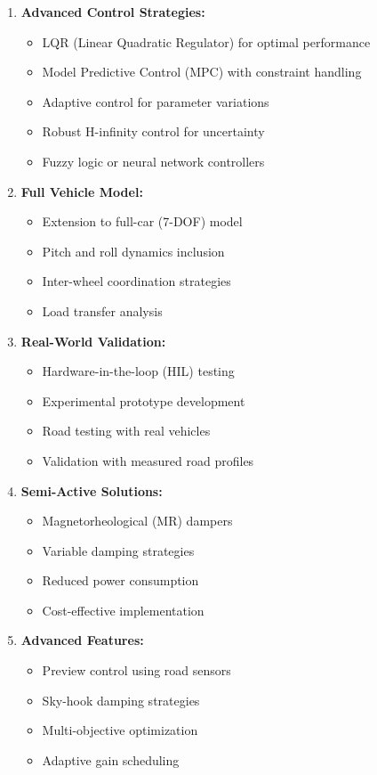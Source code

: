 \documentclass[12pt,a4paper]{article}
\begin{document}
\begin{enumerate}
    \item \textbf{Advanced Control Strategies:}
    \begin{itemize}
        \item LQR (Linear Quadratic Regulator) for optimal performance
        \item Model Predictive Control (MPC) with constraint handling
        \item Adaptive control for parameter variations
        \item Robust H-infinity control for uncertainty
        \item Fuzzy logic or neural network controllers
    \end{itemize}
    
    \item \textbf{Full Vehicle Model:}
    \begin{itemize}
        \item Extension to full-car (7-DOF) model
        \item Pitch and roll dynamics inclusion
        \item Inter-wheel coordination strategies
        \item Load transfer analysis
    \end{itemize}
    
    \item \textbf{Real-World Validation:}
    \begin{itemize}
        \item Hardware-in-the-loop (HIL) testing
        \item Experimental prototype development
        \item Road testing with real vehicles
        \item Validation with measured road profiles
    \end{itemize}
    
    \item \textbf{Semi-Active Solutions:}
    \begin{itemize}
        \item Magnetorheological (MR) dampers
        \item Variable damping strategies
        \item Reduced power consumption
        \item Cost-effective implementation
    \end{itemize}
    
    \item \textbf{Advanced Features:}
    \begin{itemize}
        \item Preview control using road sensors
        \item Sky-hook damping strategies
        \item Multi-objective optimization
        \item Adaptive gain scheduling
    \end{itemize}
\end{enumerate}
\end{document}
